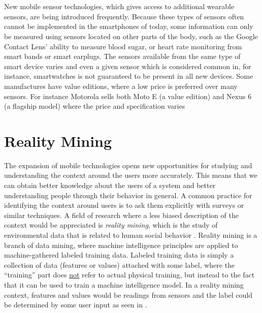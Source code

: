 \\\\
New mobile sensor technologies, which gives access to additional wearable sensors, are being introduced frequently. Because these types of sensors often cannot be implemented in the smartphones of today, some information can only be measured using sensors located on other parts of the body, such as the Google Contact Lens' ability to measure blood sugar, or heart rate monitoring from smart bands or smart earplugs. The sensors available from the same type of smart device varies and even a given sensor which is considered common in, for instance, smartwatches is not guaranteed to be present in all new devices. Some manufactures have value editions, where a low price is preferred over many sensors. For instance Motorola sells both Moto E (a value edition) and Nexus 6 (a flagship model) where the price and specification varies \parencite{moto_e_compared_to_nexus_6}

\section{Reality Mining}
\label{sec:reality_mining}
The expansion of mobile technologies opens new opportunities for studying and understanding the context around the users more accurately. This means that we can obtain better knowledge about the users of a system and better understanding people through their behavior in general. A common practice for identifying the context around users is to ask them explicitly with surveys or similar techniques. A field of research where a less biased description of the context would be appreciated is \emph{reality mining}, which is the study of environmental data that is related to human social behavior \parencite{madan2009_reality_mining_privacy}. Reality mining is a branch of data mining, where machine intelligence principles are applied to machine-gathered labeled training data. Labeled training data is simply a collection of data (features or values) attached with some label, where the ``training'' part does \underline{not} refer to actual physical training, but instead to the fact that it can be used to train a machine intelligence model. In a reality mining context, features and values would be readings from sensors and the label could be determined by some user input as seen in .

